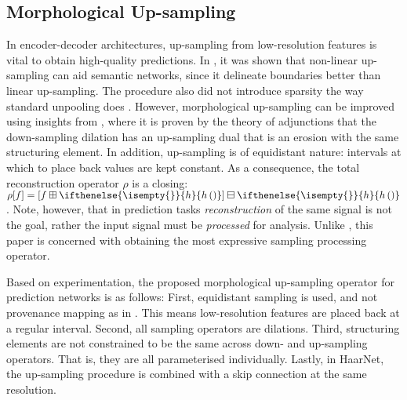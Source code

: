 \documentclass{article}
\newcommand{\kernel}[1][]{
  \ifthenelse{\isempty{#1}}
    {h}
    {h\left(#1\right)}
}
\begin{document}
\subsection{Morphological Up-sampling}
In encoder-decoder architectures, up-sampling from low-resolution features is vital to obtain high-quality predictions.
In \cite{groenendijk2022morphpool}, it was shown that non-linear up-sampling can aid semantic networks, since it delineate boundaries better than linear up-sampling.
The procedure also did not introduce sparsity the way standard unpooling does \cite{zeiler2011adaptive,zeiler2014visualizing}.
However, morphological up-sampling can be improved using insights from \cite{heijmans1991morphological}, where it is proven by the theory of adjunctions that the down-sampling dilation has an up-sampling dual that is an erosion with the same structuring element.
In addition, up-sampling is of equidistant nature: intervals at which to place back values are kept constant.
As a consequence, the total reconstruction operator $\rho$ is a closing: $\rho[f] = \left[f \boxplus \kernel\right] \boxminus \kernel$.
Note, however, that in prediction tasks \emph{reconstruction} of the same signal is not the goal, rather the input signal must be \emph{processed} for analysis.
Unlike \cite{heijmans1991morphological}, this paper is concerned with obtaining the most expressive sampling processing operator.

Based on experimentation, the proposed morphological up-sampling operator for prediction networks is as follows:
First, equidistant sampling is used, and not provenance mapping as in \cite{groenendijk2022morphpool}. This means low-resolution features are placed back at a regular interval.
Second, all sampling operators are dilations. 
Third, structuring elements are not constrained to be the same across down- and up-sampling operators. That is, they are all parameterised individually.
Lastly, in HaarNet, the up-sampling procedure is combined with a skip connection at the same resolution.
\end{document}
